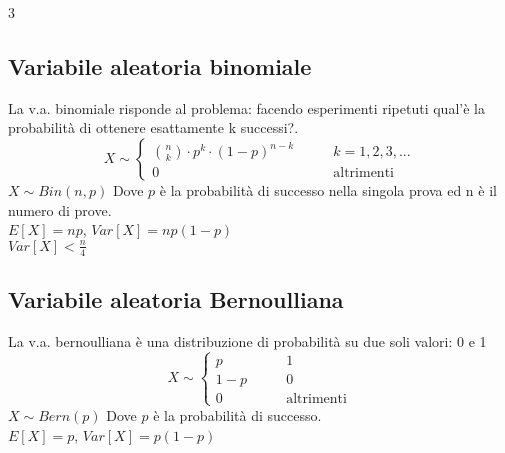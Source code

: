 \documentclass{article}
\begin{document}
\begin{multicols*}{3}
		\subsection{Variabile aleatoria binomiale}
		La v.a. binomiale risponde al problema: facendo esperimenti ripetuti qual'è la probabilità di ottenere esattamente k successi?.\\ 
		\begin{equation*}
			X \sim
			\left\{
			\begin{alignedat}{2}
				\binom{n}{k}\cdot p^k \cdot (1-p)^{n-k}  & \qquad k=1,2,3,...\\
				0            & \qquad \text{altrimenti}
			\end{alignedat}
			\right.
		\end{equation*}
		\(X \sim Bin(n,p)\) Dove \(p\) è la probabilità di successo nella singola prova ed n è il numero di prove.\\
		\(E[X] = np\), \(Var[X] = np(1-p)\)\\
		\(Var[X]< \frac{n}{4}\)
		
		\subsection{Variabile aleatoria Bernoulliana}
		La v.a. bernoulliana è una distribuzione di probabilità su due soli valori: 0 e 1\\ 
		\begin{equation*}
			X \sim
			\left\{
			\begin{alignedat}{2}
				p  & \qquad 1\\
				1-p  & \qquad 0\\
				0            & \qquad \text{altrimenti}
			\end{alignedat}
			\right.
		\end{equation*}
		\(X \sim Bern(p)\) Dove \(p\) è la probabilità di successo.\\
		\(E[X] = p\), \(Var[X] = p(1-p)\)\\
		
		
		
		
		
		
		
		
		
		
		
		 
		
		
		
		
		
		
		
	\end{multicols*}
\end{document}
